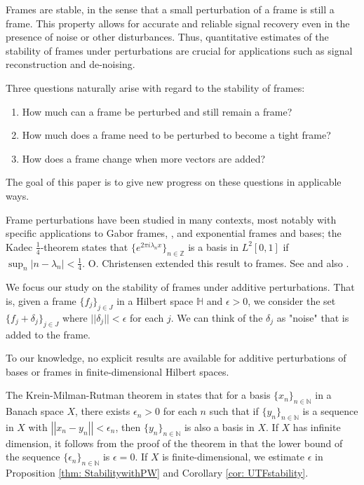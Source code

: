 \documentclass[11pt, reqno]{amsart}
\providecommand{\N}{\mathbb N}
\providecommand{\Z}{\mathbb Z}
\newcommand{\norm}[1]{\left|\left| #1 \right|\right|}
\numberwithin{equation}{section}
\begin{document}
\medskip
Frames are stable, in the sense that a small perturbation  of a frame is still a frame.  This property   allows for accurate and reliable signal recovery even in the presence of noise or other disturbances.  Thus, quantitative estimates of the stability of frames under perturbations are crucial for applications such as signal reconstruction and de-noising.  
 
\medskip
Three  questions naturally arise with regard to the stability of frames:
\begin{enumerate}
    \item How much can a frame be perturbed and still remain a frame?

    \item How much does a frame need to be perturbed to become a tight frame?
    
\item  How does a frame change when more vectors are added?
\end{enumerate}
\noindent The goal of this paper is to give new progress on these questions in applicable ways.

Frame perturbations have been studied in many contexts, most notably with specific applications to Gabor frames,   \cite{Christensen1996,DV2018,SZ2001,SZ2003}, and exponential frames and bases;
%
the Kadec $\frac{1}{4}$-theorem \cite{Kadec}   states that $\{e^{2\pi i\lambda_n x}\}_{n\in \Z}$ is a   basis in $L^2[0,1]$ if $\sup_n|n-\lambda_n|<\frac{1}{4}$. O. Christensen extended this result to frames.  
 See   \cite{ChristensenGabor}  and also   \cite{BR1997,SZ1999}.  

We focus our study on the stability of frames under additive perturbations.  That is, given a frame $\{f_j\}_{  {j\in J}}$ in a Hilbert space ${\mathbb{H}}$ and $\epsilon>0$, we consider  the set $\{f_j+\delta_j\}_ {j\in J}$ where $||\delta_j||<\epsilon$ for each $j$. 
%
We can think of the   $\delta_j$  as "noise" that is added to the frame.  



 
To our knowledge, no explicit results are available for additive perturbations of bases or frames in finite-dimensional Hilbert spaces. 
 
The Krein-Milman-Rutman theorem in \cite{Young} states that for a basis $\{x_n\}_{n\in\N}$ in a Banach space $X$, there exists $\epsilon_n>0$ for each $n$ such that if $\{y_n\}_{n \in \N}$ is a sequence in $X$ with $\norm{x_n-y_n}<\epsilon_n$, then $\{y_n\}_{n \in \N}$ is also a basis in $X$.  
  If $X$ has infinite dimension,  it follows from   the proof of  the theorem in \cite{Young} that the lower bound of the sequence $\{ \epsilon_n \}_{n\in\N}$ is $\epsilon=0$.  If $X$ is finite-dimensional, we estimate   $\epsilon$ in Proposition \ref{thm: StabilitywithPW} and Corollary \ref{cor: UTFstability}.
	
\end{document}
